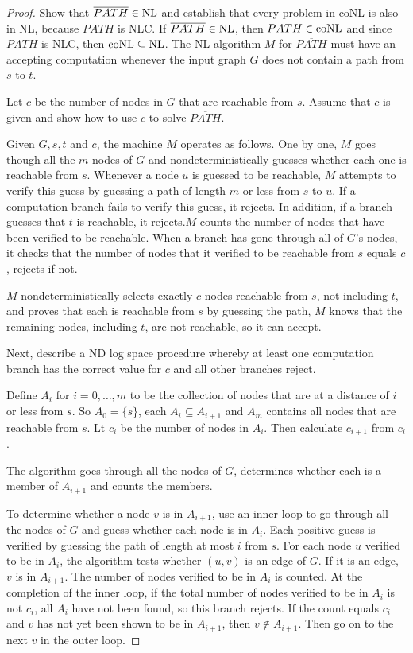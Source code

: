 \begin{mdframed}
\begin{proof}
Show that $\overline{PATH} \in \text{NL}$ and establish that every problem in coNL is also in NL, because $PATH$ is NLC. If $\overline{PATH} \in \text{NL}$, then $PATH \in \text{coNL}$ and since $PATH$ is NLC, then $\text{coNL} \subseteq \text{NL}$. The NL algorithm $M$ for $\overline{PATH}$ must have an accepting computation whenever the input graph $G$ does not contain a path from $s$ to $t$.

\medskip
Let $c$ be the number of nodes in $G$ that are reachable from $s$. Assume that $c$ is given and show how to use $c$ to solve $\overline{PATH}$. 

Given $G, s, t$ and $c$, the machine $M$ operates as follows. One by one, $M$ goes though all the $m$ nodes of $G$ and nondeterministically guesses whether each one is reachable from $s$. Whenever a node $u$ is guessed to be reachable, $M$ attempts to verify this guess by guessing a path of length $m$ or less from $s$ to $u$. If a computation branch fails to verify this guess, it rejects. In addition, if a branch guesses that $t$ is reachable, it rejects.$M$ counts the number of nodes that have been verified to be reachable. When a branch has gone through all of $G$'s nodes, it checks that the number of nodes that it verified to be reachable from $s$ equals $c$, rejects if not.

$M$ nondeterministically selects exactly $c$ nodes reachable from $s$, not including $t$, and proves that each is reachable from $s$ by guessing the path, $M$ knows that the remaining nodes, including $t$, are not reachable, so it can accept.

\medskip
Next, describe a ND log space procedure whereby at least one computation branch has the correct value for $c$ and all other branches reject.

Define $A_i$ for $i = 0, \ldots, m$ to be the collection of nodes that are at a distance of $i$ or less from $s$. So $A_0 = \{s\}$, each $A_i \subseteq A_{i+1}$ and $A_m$ contains all nodes that are reachable from $s$. Lt $c_i$ be the number of nodes in $A_i$. Then calculate $c_{i+1}$ from $c_i$. 

The algorithm goes through all the nodes of $G$, determines whether each is a member of $A_{i+1}$ and counts the members.

To determine whether a node $v$ is in $A_{i+1}$, use an inner loop to go through all the nodes of $G$ and guess whether each node is in $A_i$. Each positive guess is verified by guessing the path of length at most $i$ from $s$. For each node $u$ verified to be in $A_i$, the algorithm tests whether $(u, v)$ is an edge of $G$. If it is an edge, $v$ is in $A_{i+1}$. The number of nodes verified to be in $A_i$ is counted. At the completion of the inner loop, if the total number of nodes verified to be in $A_i$ is not $c_i$, all $A_i$ have not been found, so this branch rejects. If the count equals $c_i$ and $v$ has not yet been shown to be in $A_{i+1}$, then $v \not \in A_{i+1}$. Then go on to the next $v$ in the outer loop.


\end{proof}
\end{mdframed}

